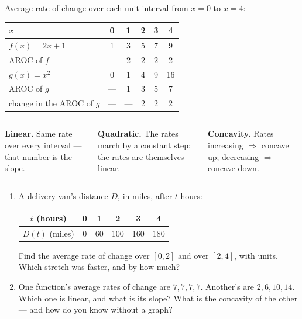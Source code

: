 \documentclass[aspectratio=169, 11pt]{beamer}
\begin{document}
\begin{frame}[t, plain]

  Average rate of change over each unit interval from \(x = 0\) to \(x = 4\):

  \medskip
  \begin{center}
  \renewcommand{\arraystretch}{1.4}
  \begin{tabular}{|l|c|c|c|c|c|}
  \hline
  \(x\) & 0 & 1 & 2 & 3 & 4 \\
  \hline
  \(f(x) = 2x + 1\) & 1 & 3 & 5 & 7 & 9 \\
  \hline
  AROC of \(f\) & --- & 2 & 2 & 2 & 2 \\
  \hline
  \(g(x) = x^2\) & 0 & 1 & 4 & 9 & 16 \\
  \hline
  AROC of \(g\) & --- & 1 & 3 & 5 & 7 \\
  \hline
  change in the AROC of \(g\) & --- & --- & 2 & 2 & 2 \\
  \hline
  \end{tabular}
  \end{center}

  \medskip
  \begin{columns}[T]
      \textbf{Linear.} Same rate over every interval --- that number is the
      slope.

      \textbf{Quadratic.} The rates march by a constant step; the rates are
      themselves linear.

      \textbf{Concavity.} Rates increasing \(\Rightarrow\) concave up;
      decreasing \(\Rightarrow\) concave down.
  \end{columns}
\end{frame}

\begin{frame}[t, plain]

  \begin{enumerate}\setlength{\itemsep}{10pt}
    \item A delivery van's distance \(D\), in miles, after \(t\) hours:

          \smallskip
          \begin{tabular}{|c|c|c|c|c|c|}
          \hline
          \(t\) (hours) & 0 & 1 & 2 & 3 & 4 \\
          \hline
          \(D(t)\) (miles) & 0 & 60 & 100 & 160 & 180 \\
          \hline
          \end{tabular}

          \smallskip
          Find the average rate of change over \([0,2]\) and over \([2,4]\),
          with units. Which stretch was faster, and by how much?

    \item One function's average rates of change are \(7, 7, 7, 7\).
          Another's are \(2, 6, 10, 14\). Which one is linear, and what is its
          slope? What is the concavity of the other --- and how do you know
          without a graph?
  \end{enumerate}
\end{frame}
\end{document}
